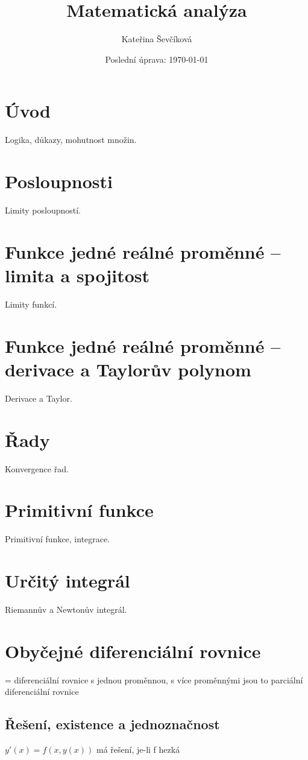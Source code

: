 \documentclass{article}
\title{Matematická analýza}
\author{Kateřina Ševčíková}
\date{Poslední úprava: \today}
\theoremstyle{definition}
\begin{document}
\maketitle

\tableofcontents
\newpage

\section{Úvod}
Logika, důkazy, mohutnost množin.

\section{Posloupnosti}
Limity posloupností.

\section{Funkce jedné reálné proměnné – limita a spojitost}
Limity funkcí.

\section{Funkce jedné reálné proměnné – derivace a Taylorův polynom}
Derivace a Taylor.

\section{Řady}
Konvergence řad.

\section{Primitivní funkce}
Primitivní funkce, integrace.

\section{Určitý integrál}
Riemannův a Newtonův integrál.

\section{Obyčejné diferenciální rovnice}
= diferenciální rovnice s jednou proměnnou, s více proměnnými jsou to parciální diferenciální rovnice

\subsection{Řešení, existence a jednoznačnost}
\(y'(x) = f(x, y(x))\) má řešení, je-li f hezká
\end{document}
